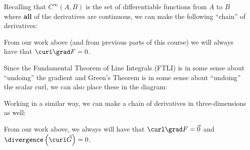 \documentclass{ximera}
\begin{document}
Recalling that $C^\infty(A,B)$ is the set of differentiable functions
from $A$ to $B$ where \textbf{all} of the derivatives are continuous,
we can make the following ``chain'' of derivatives:
\begin{image}
\end{image}
From our work above (and from previous parts of this course) we will
always have that $\curl\grad F = 0$.


Since the Fundamental Theorem of Line Integrals (FTLI) is in some
sense about ``undoing'' the gradient and Green's Theorem is in some
sense about ``undoing'' the scalar curl, we can also place these in
the diagram:
\begin{image}
\end{image}

Working in a similar way, we can make a chain of derivatives in three-dimensions as well:
\begin{image}
\end{image}
From our work above, we always will have that $\curl\grad F = \vec{0}$
and $\divergence\left(\curl \vec{G}\right) = 0$.
\end{document}
